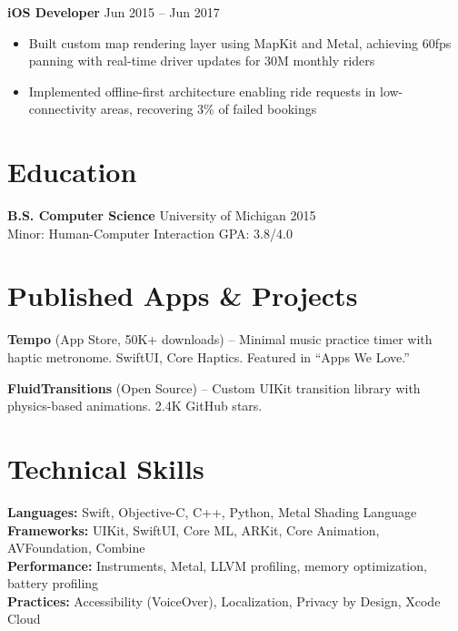 \documentclass[11pt,letterpaper]{article}
\begin{document}
\vspace{4pt}
\textbf{iOS Developer}   \hfill Jun 2015 -- Jun 2017
\begin{itemize}
    \item Built custom map rendering layer using MapKit and Metal, achieving 60fps panning with real-time driver updates for 30M monthly riders
    \item Implemented offline-first architecture enabling ride requests in low-connectivity areas, recovering 3\% of failed bookings
\end{itemize}

\section{Education}

\textbf{B.S. Computer Science} \quad University of Michigan \hfill 2015\\
{\small Minor: Human-Computer Interaction \hfill GPA: 3.8/4.0}

\section{Published Apps \& Projects}

\textbf{Tempo} {\small(App Store, 50K+ downloads)} -- Minimal music practice timer with haptic metronome. SwiftUI, Core Haptics. Featured in ``Apps We Love.''

\textbf{FluidTransitions} {\small(Open Source)} -- Custom UIKit transition library with physics-based animations. 2.4K GitHub stars.

\section{Technical Skills}

\textbf{Languages:} Swift, Objective-C, C++, Python, Metal Shading Language \\
\textbf{Frameworks:} UIKit, SwiftUI, Core ML, ARKit, Core Animation, AVFoundation, Combine \\
\textbf{Performance:} Instruments, Metal, LLVM profiling, memory optimization, battery profiling \\
\textbf{Practices:} Accessibility (VoiceOver), Localization, Privacy by Design, Xcode Cloud
\end{document}

